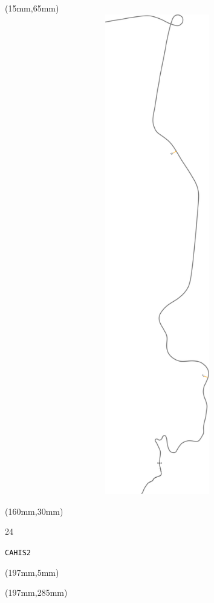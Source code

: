 \begin{textblock*}{185mm}(15mm,65mm)%
\centering
\mbox{\includegraphics[width=185mm,height=210mm,keepaspectratio]{PT/CAHIS2.pdf}}
\end{textblock*}
\begin{textblock*}{40mm}(160mm,30mm)%
\Large
\par{} 
\par24 
\par\hfill\tiny\tt CAHIS2\\
\end{textblock*}
\begin{textblock*}{20mm}(197mm,5mm)%
\fbox{\thepage}
\label{CAHIS2}
\end{textblock*}
\begin{textblock*}{20mm}(197mm,285mm)%
\fbox{\thepage}
\end{textblock*}

